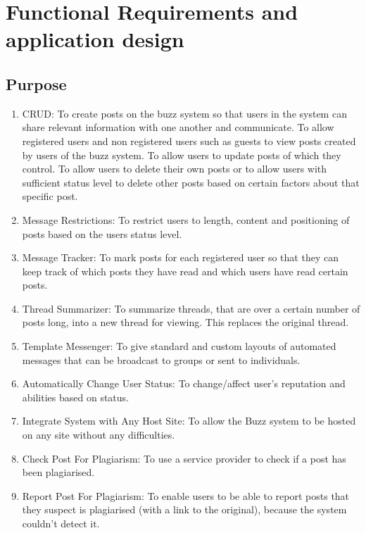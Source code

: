 \documentclass[hidelinks, 12pt, oneside]{article}
\begin{document}
\section{Functional Requirements and application design}

\subsection{Purpose}
\begin{enumerate}
 \item{CRUD}: To create posts on the buzz system so that users in the system can share relevant information with one another and communicate. To allow registered users and non registered users such as guests to view posts created by users of the buzz system. To allow users to update posts of which they control. To allow users to delete their own posts or to allow users with sufficient status level to delete other posts based on certain factors about that specific post.
 
\item{Message Restrictions}: To restrict users to length, content and positioning of posts based on the users status level. 

 \item{Message Tracker}: To mark posts for each registered user so that they can keep track of which posts they have read and which users have read certain posts.

 \item{Thread Summarizer}: To summarize threads, that are over a certain number of posts long, into a new thread for viewing. This replaces the original thread.

 \item{Template Messenger}: To give standard and custom layouts of automated messages that can be broadcast to groups or sent to individuals.

\item{Automatically Change User Status}: To change/affect user's reputation and abilities based on status.

\item{Integrate System with Any Host Site}: To allow the Buzz system to be hosted on any site without any difficulties.

\item{Check Post For Plagiarism}: To use a service provider to check if a post has been plagiarised.

\item{Report Post For Plagiarism}: To enable users to be able to report posts that they suspect is plagiarised (with a link to the original), because the system couldn't detect it.


\end{enumerate}
\end{document}
